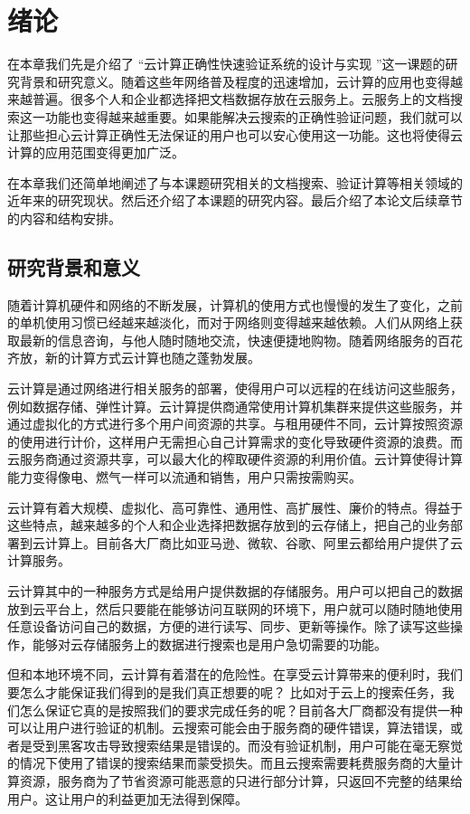 \chapter{绪论}
\label{chap:introduction}

在本章我们先是介绍了
“云计算正确性快速验证系统的设计与实现
”这一课题的研究背景和研究意义。随着这些年网络普及程度的迅速增加，云计算的应用也变得越来越普遍。很多个人和企业都选择把文档数据存放在云服务上。云服务上的文档搜索这一功能也变得越来越重要。如果能解决云搜索的正确性验证问题，我们就可以让那些担心云计算正确性无法保证的用户也可以安心使用这一功能。这也将使得云计算的应用范围变得更加广泛。

在本章我们还简单地阐述了与本课题研究相关的文档搜索、验证计算等相关领域的近年来的研究现状。然后还介绍了本课题的研究内容。最后介绍了本论文后续章节的内容和结构安排。

\section{研究背景和意义}
随着计算机硬件和网络的不断发展，计算机的使用方式也慢慢的发生了变化，之前的单机使用习惯已经越来越淡化，而对于网络则变得越来越依赖。人们从网络上获取最新的信息咨询，与他人随时随地交流，快速便捷地购物。随着网络服务的百花齐放，新的计算方式云计算也随之蓬勃发展。

云计算是通过网络进行相关服务的部署，使得用户可以远程的在线访问这些服务，例如数据存储、弹性计算。云计算提供商通常使用计算机集群来提供这些服务，并通过虚拟化的方式进行多个用户间资源的共享。与租用硬件不同，云计算按照资源的使用进行计价，这样用户无需担心自己计算需求的变化导致硬件资源的浪费。而云服务商通过资源共享，可以最大化的榨取硬件资源的利用价值。云计算使得计算能力变得像电、燃气一样可以流通和销售，用户只需按需购买。

云计算有着大规模、虚拟化、高可靠性、通用性、高扩展性、廉价的特点。得益于这些特点，越来越多的个人和企业选择把数据存放到的云存储上，把自己的业务部署到云计算上。目前各大厂商比如亚马逊、微软、谷歌、阿里云都给用户提供了云计算服务。

云计算其中的一种服务方式是给用户提供数据的存储服务。用户可以把自己的数据放到云平台上，然后只要能在能够访问互联网的环境下，用户就可以随时随地使用任意设备访问自己的数据，方便的进行读写、同步、更新等操作。除了读写这些操作，能够对云存储服务上的数据进行搜索也是用户急切需要的功能。

但和本地环境不同，云计算有着潜在的危险性。在享受云计算带来的便利时，我们要怎么才能保证我们得到的是我们真正想要的呢？
比如对于云上的搜索任务，我们怎么保证它真的是按照我们的要求完成任务的呢？目前各大厂商都没有提供一种可以让用户进行验证的机制。云搜索可能会由于服务商的硬件错误，算法错误，或者是受到黑客攻击导致搜索结果是错误的。而没有验证机制，用户可能在毫无察觉的情况下使用了错误的搜索结果而蒙受损失。而且云搜索需要耗费服务商的大量计算资源，服务商为了节省资源可能恶意的只进行部分计算，只返回不完整的结果给用户。这让用户的利益更加无法得到保障。

